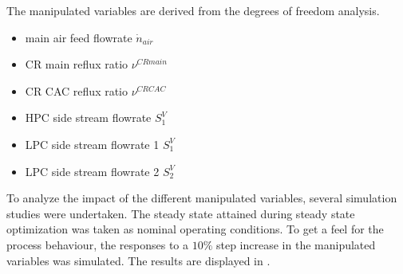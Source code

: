             The manipulated variables are derived from the degrees of freedom analysis.
            \begin{itemize}
                \item main air feed flowrate $\dot{n}_{air}$
                \item CR main reflux ratio $\nu^{CR main}$
                \item CR CAC reflux ratio $\nu^{CR CAC}$
                \item HPC side stream flowrate $S^V_1$
                \item LPC side stream flowrate 1 $S^V_1$
                \item LPC side stream flowrate 2 $S^V_2$
            \end{itemize}

            To analyze the impact of the different manipulated variables, several simulation studies were
            undertaken. The steady state attained during steady state optimization was taken as nominal operating
            conditions. To get a feel for the process behaviour, the responses to a $10 \%$ step increase in
            the manipulated variables was simulated. The results are displayed in .

